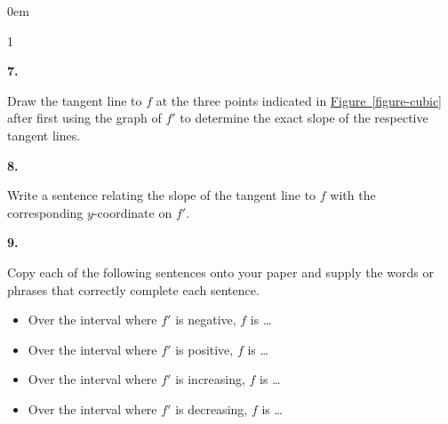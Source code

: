\documentclass[12pt,]{book}
\theoremstyle{plain}
\theoremstyle{definition}
\numberwithin{equation}{section}
\newenvironment{exercisegroup}%
{\medskip\noindent}%
{\par\bigskip}%
\newlength{\exercisegroupindent}%
\newlength{\exercisegroupitemwidth}%
\newenvironment{exercisegrouplist}%
{\vspace{-\partopsep}%
\begin{adjustwidth}{\exercisegroupindent}{0em}}%
{\end{adjustwidth}%
\vspace{-\partopsep}%
\vspace{\baselineskip}}%
\newenvironment{exercisegroupbycol}[1]%
{\begin{exercisegrouplist}%
\vspace{-\multicolsep}%
\begin{multicols}{#1}%
\setlength{\parindent}{0em}%
\setlength{\exercisegroupitemwidth}{\linewidth}}%
{\end{multicols}%
\vspace{-\multicolsep}%
\end{exercisegrouplist}}%
\newenvironment{exercisegroupitem}[1]%
{\begin{minipage}[t]{\exercisegroupitemwidth}
\vspace{0pt}%
{\bfseries#1}%
\rule{0pt}{\baselineskip}}{\strut%
\end{minipage}%
\hspace{\columnsep}}%
\providecommand\phantomsection{}
\newcommand{\fd}[1]{#1'}
\begin{document}
\begin{exercisegroup}
\begin{exercisegroupbycol}{1}
\begin{exercisegroupitem}{7. }
Draw the tangent line to \(f\) at the three points indicated in \hyperref[figure-cubic]{Figure~\ref*{figure-cubic}} after first using the graph of \(\fd{f}\) to determine the exact slope of the respective tangent lines.%
\end{exercisegroupitem}%
\par%
\begin{exercisegroupitem}{8. }\phantomsection\hypertarget{exercise-160}{\null}
Write a sentence relating the slope of the tangent line to \(f\) with the corresponding \(y\)-coordinate on \(\fd{f}\).%
\end{exercisegroupitem}%
\par%
\begin{exercisegroupitem}{9. }\phantomsection\hypertarget{exercise-161}{\null}
Copy each of the following sentences onto your paper and supply the words or phrases that correctly complete each sentence.%
\begin{itemize}[label=\textbullet]
\item{}Over the interval where \(\fd{f}\) is negative, \(f\) is \dots{}\item{}Over the interval where \(\fd{f}\) is positive, \(f\) is \dots{}\item{}Over the interval where \(\fd{f}\) is increasing, \(f\) is \dots{}\item{}Over the interval where \(\fd{f}\) is decreasing, \(f\) is \dots{}\end{itemize}
\end{exercisegroupitem}%
\par%
\end{exercisegroupbycol}%
\end{exercisegroup}%
\end{document}

